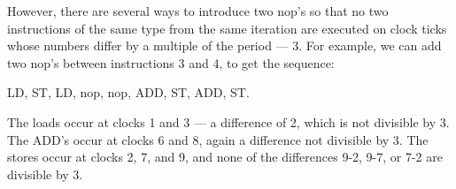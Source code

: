 \begin{problem}
{However, there are several ways to introduce two nop's so that no two instructions of the same type from the same iteration are executed on clock ticks whose numbers differ by a multiple of the period --- 3. For example, we can add two nop's between instructions 3 and 4, to get the sequence:

LD, ST, LD, nop, nop, ADD, ST, ADD, ST.

The loads occur at clocks 1 and 3 --- a difference of 2, which is not divisible by 3. The ADD's occur at clocks 6 and 8, again a difference not divisible by 3. The stores occur at clocks 2, 7, and 9, and none of the differences 9-2, 9-7, or 7-2 are divisible by 3.
}
\end{problem}


